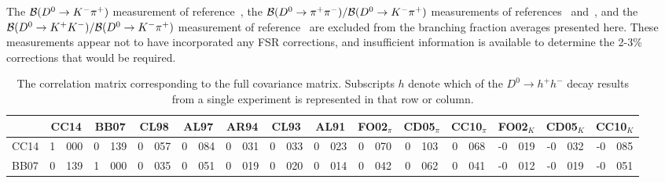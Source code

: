 The ${\cal B}(D^0\to K^-\pi^+)$ measurement of reference~\cite{Coan:1997ye}, the  
${\cal B}(D^0\to \pi^+\pi^-)/{\cal B}(D^0\to K^-\pi^+)$ measurements of 
references~\cite{Aitala:1997ff} 
and~\cite{Csorna:2001ww}, and the 
${\cal B}(D^0\to K^+ K^-)/{\cal B}(D^0\to K^-\pi^+)$ measurement
of reference~\cite{Csorna:2001ww} are excluded from the branching 
fraction averages presented here.
These measurements appear not to have incorporated any FSR corrections, 
and insufficient information
is available to determine the 2-3\% corrections that would be required.

\begin{table}
  \centering 
  \caption{The correlation matrix corresponding to the full covariance matrix. 
  Subscripts $h$ denote which of the $D^0 \to h^+ h^-$ decay results from a single experiment
  is represented in that row or column.}\label{tab:correlations}
  \small
\begin{tabular}{lr@{.}lr@{.}lr@{.}lr@{.}lr@{.}lr@{.}lr@{.}lr@{.}lr@{.}lr@{.}lr@{.}lr@{.}lr@{.}l}
\hline\hline
           & \multicolumn{2}{c}{CC14}
                   & \multicolumn{2}{c}{BB07}
                           & \multicolumn{2}{c}{CL98}
                                   & \multicolumn{2}{c}{AL97}
                                           & \multicolumn{2}{c}{AR94} 
                                                   & \multicolumn{2}{c}{CL93} 
                                                           & \multicolumn{2}{c}{AL91} 
                                                                   & \multicolumn{2}{c}{FO02$_\pi$} 
                                                                           & \multicolumn{2}{c}{CD05$_\pi$} 
                                                                                   & \multicolumn{2}{c}{CC10$_\pi$} 
                                                                                           & \multicolumn{2}{c}{FO02$_K$}
                                                                                                    & \multicolumn{2}{c}{CD05$_K$} 
                                                                                                            & \multicolumn{2}{c}{CC10$_K$} \\ \hline
CC14 & 1&000 & 0&139 & 0&057 & 0&084 & 0&031 & 0&033 & 0&023 & 0&070 & 0&103 & 0&068 &-0&019 &-0&032 &-0&085 \\
BB07 & 0&139 & 1&000 & 0&035 & 0&051 & 0&019 & 0&020 & 0&014 & 0&042 & 0&062 & 0&041 &-0&012 &-0&019 &-0&051 \\

\end{tabular}
\end{table}
